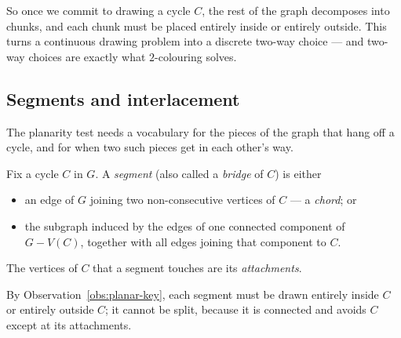 So once we commit to drawing a cycle $C$, the rest of the graph decomposes into
chunks, and each chunk must be placed entirely inside or entirely outside. This
turns a continuous drawing problem into a discrete two-way choice --- and
two-way choices are exactly what $2$-colouring solves.

\subsection{Segments and interlacement}\label{sec:planar-segments}

The planarity test needs a vocabulary for the pieces of the graph that hang off
a cycle, and for when two such pieces get in each other's way.

\begin{definition}[Segment]\label{def:planar-segment}
Fix a cycle $C$ in $G$. A \emph{segment} (also called a \emph{bridge} of $C$)
is either
\begin{itemize}[nosep]
  \item an edge of $G$ joining two non-consecutive vertices of $C$ --- a
        \emph{chord}; or
  \item the subgraph induced by the edges of one connected component of
        $G - V(C)$, together with all edges joining that component to $C$.
\end{itemize}
The vertices of $C$ that a segment touches are its \emph{attachments}.
\end{definition}

By Observation~\ref{obs:planar-key}, each segment must be drawn entirely inside $C$ or
entirely outside $C$; it cannot be split, because it is connected and avoids
$C$ except at its attachments.


